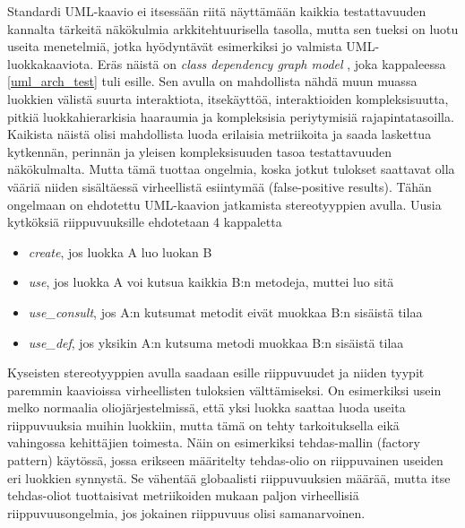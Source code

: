 \documentclass[finnish]{tktltiki2}
\numberwithin{table}{section}
\theoremstyle{definition}
\theoremstyle{remark}
\begin{document}
Standardi UML-kaavio ei itsessään riitä näyttämään kaikkia testattavuuden kannalta tärkeitä näkökulmia arkkitehtuurisella tasolla, mutta sen tueksi on luotu useita menetelmiä, jotka hyödyntävät esimerkiksi jo valmista UML-luokkakaaviota. Eräs näistä on \textit{class dependency graph model} \citep{baudry_testability_2002}, joka kappaleessa \ref{uml_arch_test} tuli esille. Sen avulla on mahdollista nähdä muun muassa luokkien välistä suurta interaktiota, itsekäyttöä, interaktioiden kompleksisuutta, pitkiä luokkahierarkisia haaraumia ja kompleksisia periytymisiä rajapintatasoilla.
Kaikista näistä olisi mahdollista luoda erilaisia metriikoita ja saada laskettua kytkennän, perinnän ja yleisen kompleksisuuden tasoa testattavuuden näkökulmalta. Mutta tämä tuottaa ongelmia, koska jotkut tulokset saattavat olla vääriä niiden sisältäessä virheellistä esiintymää (false-positive results). Tähän ongelmaan on ehdotettu UML-kaavion jatkamista stereotyyppien avulla. Uusia kytköksiä riippuvuuksille ehdotetaan 4 kappaletta \citep[s. 4]{baudry_measuring_2003}

\begin{itemize}
	\item \textit{create}, jos luokka A luo luokan B
	\item \textit{use}, jos luokka A voi kutsua kaikkia B:n metodeja, muttei luo sitä
	\item \textit{use\_consult}, jos A:n kutsumat metodit eivät muokkaa B:n sisäistä tilaa
	\item \textit{use\_def}, jos yksikin A:n kutsuma metodi muokkaa B:n sisäistä tilaa
\end{itemize}

\noindent
Kyseisten stereotyyppien avulla saadaan esille riippuvuudet ja niiden tyypit paremmin kaavioissa virheellisten tuloksien välttämiseksi. On esimerkiksi usein melko normaalia oliojärjestelmissä, että yksi luokka saattaa luoda useita riippuvuuksia muihin luokkiin, mutta tämä on tehty tarkoituksella eikä vahingossa kehittäjien toimesta. Näin on esimerkiksi tehdas-mallin (factory pattern) käytössä, jossa erikseen määritelty tehdas-olio on riippuvainen useiden eri luokkien synnystä. Se vähentää globaalisti riippuvuuksien määrää, mutta itse tehdas-oliot tuottaisivat metriikoiden mukaan paljon virheellisiä riippuvuusongelmia, jos jokainen riippuvuus olisi samanarvoinen.



\end{document}
